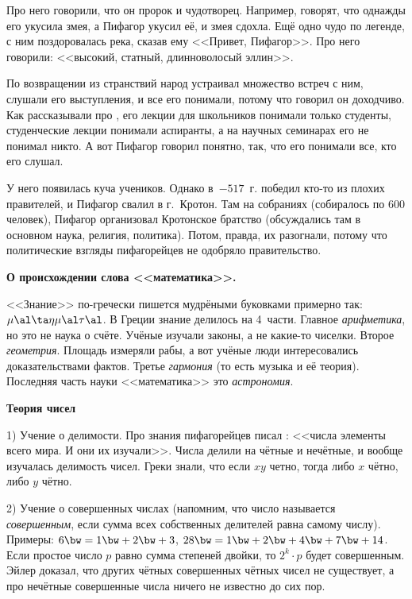 \documentclass[a4paper,oneside,fleqn,10pt]{article}
\begin{document}
Про него говорили, что он пророк и чудотворец. Например, говорят, что однажды его укусила змея,
а Пифагор укусил её, и змея сдохла.
Ещё одно чудо по легенде, с ним поздоровалась река, сказав ему <<Привет, Пифагор>>.
Про него говорили: <<высокий, статный, длинноволосый эллин>>.

По возвращении из странствий народ устраивал
множество встреч с ним, слушали его выступления, и все его понимали, потому что говорил он доходчиво.
Как рассказывали про , его лекции для школьников понимали только студенты,
студенческие лекции понимали аспиранты, а на научных семинарах его не понимал никто.
А вот Пифагор говорил понятно, так, что его понимали все, кто его слушал.

У него появилась куча учеников. Однако в~$-517$~г. победил кто-то из плохих правителей,
и Пифагор свалил в г.~Кротон. Там на собраниях (собиралось по 600 человек),
Пифагор организовал Кротонское братство (обсуждались там в основном
наука, религия, политика). Потом, правда, их разогнали, потому что политические взгляды пифагорейцев
не одобряло правительство.

\textbf{О происхождении слова <<математика>>.}

<<Знание>> по-гречески пишется мудрёными буковками примерно так:
$\mu\al\ta\eta\mu\al\tau\al$.
В Греции знание делилось на 4~части. Главное \emph{арифметика}, но это не наука о счёте.
Учёные изучали законы, а не какие-то чиселки. Второе \emph{геометрия}.
Площадь измеряли рабы, а вот учёные люди интересовались доказательствами фактов.
Третье \emph{гармония} (то есть музыка и её теория).
Последняя часть науки <<математика>> это \emph{астрономия}.

\textbf{Теория чисел}

1) Учение о делимости. Про знания пифагорейцев писал :
<<числа элементы всего мира. И они их изучали>>.
Числа делили на чётные и нечётные, и вообще изучалась делимость чисел.
Греки знали, что если $xy$ четно, тогда либо $x$ чётно, либо $y$ чётно.

2) Учение о совершенных числах (напомним, что число называется \emph{совершенным},
если сумма всех собственных делителей равна самому числу).
Примеры: $6 \bw= 1 \bw+ 2 \bw+ 3$, $28 \bw= 1 \bw+ 2 \bw+ 4 \bw+ 7 \bw+ 14$.
Если простое число $p$ равно сумма степеней двойки, то $2^k \cdot p$ будет
совершенным. 
Эйлер доказал, что других чётных совершенных чётных чисел не существует,
а про нечётные совершенные числа ничего не известно до сих пор.
\end{document}
